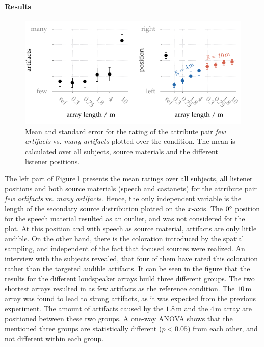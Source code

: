 \paragraph{Results}
\begin{figure}
    \centering
    \includegraphics{fig5_17/fig5_17}
    \caption{Mean and standard error for the
        rating of the attribute pair \emph{few artifacts} vs. \emph{many
        artifacts} plotted over the condition.
        The mean is calculated over all subjects,
        source materials and the different listener positions.
    }
    \label{fig:fs_exp2_results}
\end{figure}
%
The left part of Figure\,\ref{fig:fs_exp2_results} presents the mean ratings
over all subjects, all listener positions and both source materials (speech and
castanets) for the attribute pair \emph{few artifacts} vs. \emph{many
artifacts}.  Hence, the only independent variable is the length of the secondary
source distribution plotted on the $x$-axis.
The $0^\circ$ position for the speech material
resulted as an outlier, and was not considered for the plot.  At this position
and with speech as source material, artifacts are only little audible.  On the
other hand, there is the coloration introduced by the spatial sampling, and
independent of the fact that focused sources were realized. An interview with
the subjects revealed, that four of them have rated this coloration rather than
the targeted audible artifacts.  It can be seen in the figure that the results
for the different loudspeaker arrays build three different groups.  The two
shortest arrays resulted in as few artifacts as the reference condition.  The
$10$\,m array was found to lead to strong artifacts, as it was expected from the
previous experiment. The amount of artifacts caused by the $1.8$\,m and the
$4$\,m array are positioned between these two groups.  A one-way ANOVA shows
that the mentioned three groups are statistically different ($p < 0.05$) from
each other, and not different within each group.

